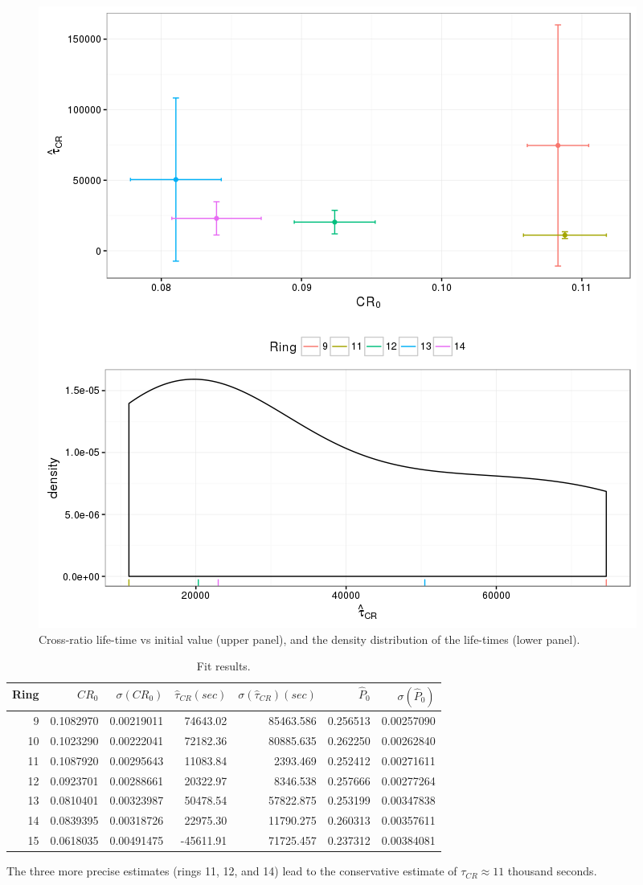 \documentclass{article}
\begin{document}
\begin{figure}[h]
	\centering
	\includegraphics[scale=.8]{PolAna-CRLTvsCR0}
	\caption{Cross-ratio life-time vs initial value (upper panel), and the density distribution of the life-times (lower panel).\label{fig:R-SepRings}}
\end{figure}

\begin{table}[h]
	\centering
	\caption{Fit results.\label{tbl:FitRes}}
	\begin{tabular}{rrrrrrr}
		\hline
		Ring &    $CR_0$ & $\sigma(CR_0)$ & $\hat{\tau}_{CR} (sec)$ & $\sigma(\hat{\tau}_{CR})(sec)$ & $\hat{P}_0$ & $\sigma(\hat{P}_0)$ \\ \hline
		   9 & 0.1082970 &     0.00219011 &                74643.02 &                      85463.586 &    0.256513 &          0.00257090 \\
		  10 & 0.1023290 &     0.00222041 &                72182.36 &                      80885.635 &    0.262250 &          0.00262840 \\
		  11 & 0.1087920 &     0.00295643 &                11083.84 &                       2393.469 &    0.252412 &          0.00271611 \\
		  12 & 0.0923701 &     0.00288661 &                20322.97 &                       8346.538 &    0.257666 &          0.00277264 \\
		  13 & 0.0810401 &     0.00323987 &                50478.54 &                      57822.875 &    0.253199 &          0.00347838 \\
		  14 & 0.0839395 &     0.00318726 &                22975.30 &                      11790.275 &    0.260313 &          0.00357611 \\
		  15 & 0.0618035 &     0.00491475 &               -45611.91 &                      71725.457 &    0.237312 &          0.00384081 \\ \hline
	\end{tabular}
\end{table}

The three more precise estimates (rings 11, 12, and 14) lead to the conservative estimate of $\tau_{CR}\approx 11$ thousand seconds.
\end{document}
